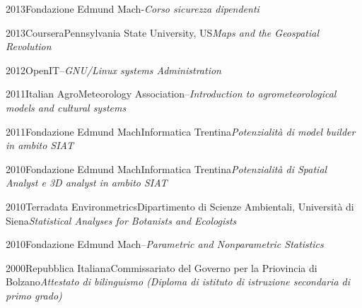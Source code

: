\documentclass{curriculum}
\begin{document}
    \begin{entrylist}
    \entry
        {2013}{Fondazione Edmund Mach}{-}{\emph{Corso sicurezza dipendenti}}
    \end{entrylist}
    
    \begin{entrylist}
    \entry
        {2013}{Coursera}{Pennsylvania State University, US}{\emph{Maps and the Geospatial Revolution}}
    \end{entrylist}
    
    \begin{entrylist}
    \entry
        {2012}{OpenIT}{--}{\emph{GNU/Linux systems Administration}}
    \end{entrylist}
    
    \begin{entrylist}
    \entry
        {2011}{Italian AgroMeteorology Association}{--}{\emph{Introduction to agrometeorological models and cultural systems}}
    \end{entrylist}
    
    \begin{entrylist}
    \entry
        {2011}{Fondazione Edmund Mach}{Informatica Trentina}{\emph{Potenzialità di model builder in ambito SIAT}}
    \end{entrylist}   
    
    \begin{entrylist}
    \entry
        {2010}{Fondazione Edmund Mach}{Informatica Trentina}{\emph{Potenzialità di Spatial Analyst e 3D analyst in ambito SIAT}}
    \end{entrylist} 
    
    \begin{entrylist}
    \entry
        {2010}{Terradata Environmetrics}{Dipartimento di Scienze Ambientali, Università di Siena}{\emph{Statistical Analyses for Botanists and Ecologists}}
    \end{entrylist}
    
    \begin{entrylist}
    \entry
        {2010}{Fondazione Edmund Mach}{--}{\emph{Parametric and Nonparametric Statistics}}
    \end{entrylist}
    
    \begin{entrylist}
    \entry
        {2000}{Repubblica Italiana}{Commissariato del Governo per la Priovincia di Bolzano}{\emph{Attestato di bilinguismo (Diploma di istituto di istruzione secondaria di primo grado)}}
    \end{entrylist}
    
\end{document}
